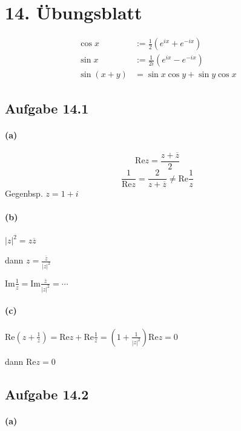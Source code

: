 \section{14. Übungsblatt}

\begin{align*}
\cos x&:=\frac{1}{2}(e^{ix}+e^{-ix})\\
\sin x&:=\frac{1}{2i}(e^{ix}-e^{-ix})\\
\sin(x+y)&=\sin x\cos y+\sin y\cos x
\end{align*}

\subsection{Aufgabe 14.1}

\paragraph{(a)}

\begin{equation*}
\mathrm{Re}z=\frac{z+\overline{z}}{2}
\end{equation*}
\begin{equation*}
\frac{1}{\mathrm{Re}z}=\frac{2}{z+\overline{z}}\neq\mathrm{Re}\frac{1}{z}
\end{equation*}
Gegenbsp. $z=1+i$

\paragraph{(b)}

$|z|^2=z\overline{z}$

dann $z=\frac{\overline{z}}{|z|^2}$

$\mathrm{Im}\frac{1}{z}=\mathrm{Im}\frac{\overline{z}}{|z|^2}=\cdots$

\paragraph{(c)}

$\mathrm{Re}(z+\frac{1}{z})=\mathrm{Re}z+\mathrm{Re}\frac{1}{z}=(1+\frac{1}{|z|^2})\mathrm{Re}z=0$

dann $\mathrm{Re}z=0$

\subsection{Aufgabe 14.2}

\paragraph{(a)}

